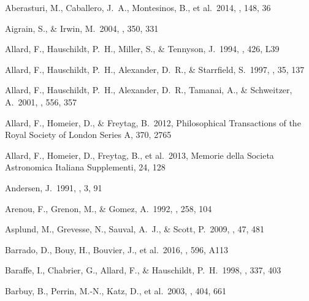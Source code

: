 \documentclass[fleqn,usenatbib]{mnras}
\begin{document}
\begin{thebibliography}{99}

 Aberasturi, M., Caballero, J.~A., Montesinos, B., et al.\ 2014, \aj, 148, 36 

 Aigrain, S., \& Irwin, M.\ 2004, \mnras, 350, 331 

 Allard, F., Hauschildt, P.~H., Miller, S., \& Tennyson, J.\ 1994, \apjl, 426, L39 

 Allard, F., Hauschildt, P.~H., Alexander, D.~R., \& Starrfield, S.\ 1997, \araa, 35, 137 

 Allard, F., Hauschildt, P.~H., Alexander, D.~R., Tamanai, A., \& Schweitzer, A.\ 2001, \apj, 556, 357 

 Allard, F., Homeier, D., \& Freytag, B.\ 2012, Philosophical Transactions of the Royal Society of London Series A, 370, 2765

 Allard, F., Homeier, D., Freytag, B., et al.\ 2013, Memorie della Societa Astronomica Italiana Supplementi, 24, 128 

 Andersen, J.\ 1991, \aapr, 3, 91 

 Arenou, F., Grenon, M., \& Gomez, A.\ 1992, \aap, 258, 104 

 Asplund, M., Grevesse, N., Sauval, A.~J., \& Scott, P.\ 2009, \araa, 47, 481 

 Barrado, D., Bouy, H., Bouvier, J., et al.\ 2016, \aap, 596, A113 

 Baraffe, I., Chabrier, G., Allard, F., \& Hauschildt, P.~H.\ 1998, \aap, 337, 403 

 Barbuy, B., Perrin, M.-N., Katz, D., et al.\ 2003, \aap, 404, 661 


\end{thebibliography}
\end{document}
